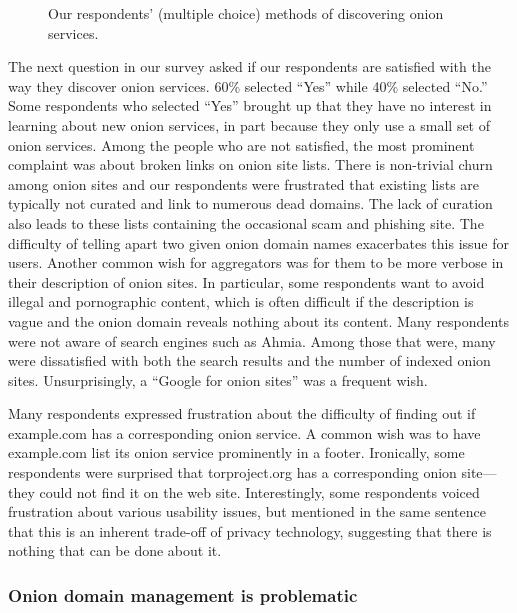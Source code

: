 \begin{figure}[t]
    \centering
    
    \caption{Our respondents' (multiple choice) methods of discovering onion
    services.}
    \label{fig:onion-discovery}
\end{figure}

The next question in our survey asked if our respondents are satisfied with the
way they discover onion services.  60\% selected ``Yes'' while 40\% selected
``No.'' Some respondents who selected ``Yes'' brought up that they have no
interest in learning about new onion services, in part because they only use a
small set of onion services.  Among the people who are not satisfied, the most
prominent complaint was about broken links on onion site lists.  There is
non-trivial churn among onion sites and our respondents were frustrated that
existing lists are typically not curated and link to numerous dead domains.  The
lack of curation also leads to these lists containing the occasional scam and
phishing site.  The difficulty of telling apart two given onion domain names
exacerbates this issue for users.  Another common wish for aggregators was for
them to be more verbose in their description of onion sites.  In particular,
some respondents want to avoid illegal and pornographic content, which is often
difficult if the description is vague and the onion domain reveals nothing about
its content.  Many respondents were not aware of search engines such as Ahmia.
Among those that were, many were dissatisfied with both the search results and
the number of indexed onion sites.  Unsurprisingly, a ``Google for onion sites''
was a frequent wish.

Many respondents expressed frustration about the difficulty of finding out if
example.com has a corresponding onion service.  A common wish was to have
example.com list its onion service prominently in a footer.  Ironically, some
respondents were surprised that torproject.org has a corresponding onion
site---they could not find it on the web site.  Interestingly, some respondents
voiced frustration about various usability issues, but mentioned in the same
sentence that this is an inherent trade-off of privacy technology, suggesting
that there is nothing that can be done about it.

\subsubsection{Onion domain management is problematic}

